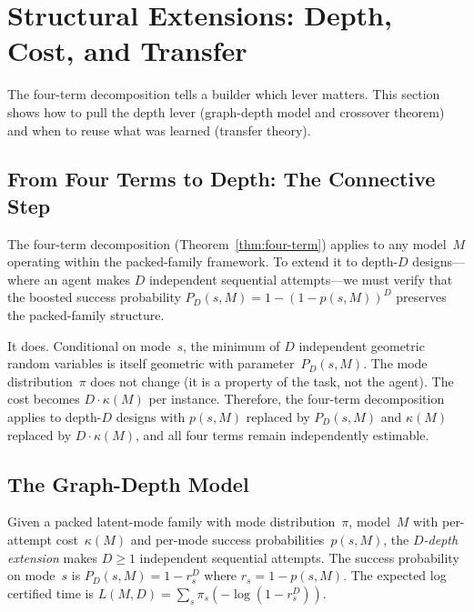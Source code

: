 \section{Structural Extensions: Depth, Cost, and Transfer}
\label{sec:extensions}

The four-term decomposition tells a builder which lever matters.
This section shows how to pull the depth lever (graph-depth model and crossover theorem) and when to reuse what was learned (transfer theory).

\subsection{From Four Terms to Depth: The Connective Step}
\label{sec:connective}

The four-term decomposition (Theorem~\ref{thm:four-term}) applies to any model~$M$ operating within the packed-family framework.
To extend it to depth-$D$ designs---where an agent makes $D$ independent sequential attempts---we must verify that the boosted success probability $P_D(s, M) = 1 - (1 - p(s,M))^D$ preserves the packed-family structure.

It does.
Conditional on mode~$s$, the minimum of $D$ independent geometric random variables is itself geometric with parameter~$P_D(s, M)$.
The mode distribution~$\pi$ does not change (it is a property of the task, not the agent).
The cost becomes $D \cdot \kappa(M)$ per instance.
Therefore, the four-term decomposition applies to depth-$D$ designs with $p(s,M)$ replaced by $P_D(s,M)$ and $\kappa(M)$ replaced by $D \cdot \kappa(M)$, and all four terms remain independently estimable.

\subsection{The Graph-Depth Model}
\label{sec:graph-depth}

\begin{definition}
\label{def:graph-depth}
Given a packed latent-mode family with mode distribution~$\pi$, model~$M$ with per-attempt cost~$\kappa(M)$ and per-mode success probabilities~$p(s,M)$, the \emph{$D$-depth extension} makes $D \ge 1$ independent sequential attempts.
The success probability on mode~$s$ is $P_D(s,M) = 1 - r_s^D$ where $r_s = 1 - p(s,M)$.
The expected log certified time is $L(M, D) = \sum_s \pi_s (-\log(1 - r_s^D))$.
\end{definition}

